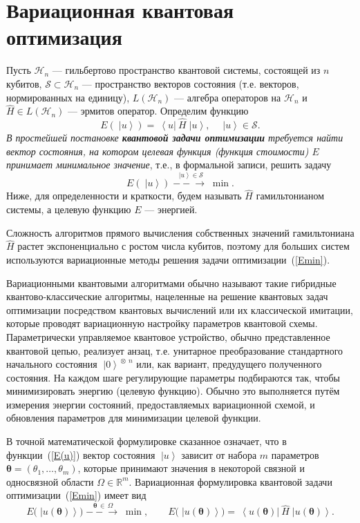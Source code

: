 \documentclass[a4paper]{report}
\newcommand{\ket}[1] {\!\!\;\ensuremath{\left|#1\right\rangle}}
\newcommand{\bra}[1] {\!\!\:\ensuremath{\left\langle#1\right|\!\!\:}}
\begin{document}
\section{Вариационная квантовая оптимизация}

Пусть $\mathcal{H}_n$ --- гильбертово пространство квантовой системы, состоящей из $n$ кубитов, ${\mathcal{S}\subset\mathcal{H}_n}$ --- пространство векторов состояния (т.е. векторов, нормированных на единицу), $L(\mathcal{H}_n)$ --- алгебра операторов на $\mathcal{H}_n$ и ${\hat{H}\in L(\mathcal{H}_n)}$ --- эрмитов оператор. Определим функцию
\begin{equation}\label{E(u)}
  E(\ket{u})=\bra{u}\hat{H}\ket{u},\quad \ket{u}\in\mathcal{S}.
\end{equation}
\textit{В простейшей постановке \textbf{квантовой задачи оптимизации} требуется найти вектор состояния, на котором целевая функция (функция стоимости) $E$ принимает минимальное значение}, т.е., в формальной записи, решить задачу
\begin{equation}\label{Emin}
  E(\ket{u})\; \stackrel{\ket{u}\in\mathcal{S}}{-\!-\!\!\!\longrightarrow}\; \min.
\end{equation}
Ниже, для определенности и краткости, будем называть $\hat{H}$ гамильтонианом системы, а целевую функцию $E$ --- энергией.

Сложность алгоритмов прямого вычисления собственных значений гамильтониана $\hat{H}$ растет экспоненциально с ростом числа кубитов, поэтому для больших систем используются вариационные методы решения задачи оптимизации~(\ref{Emin}).

Вариационными квантовыми алгоритмами обычно называют такие гибридные квантово-классические алгоритмы, нацеленные на решение квантовых задач оптимизации посредством квантовых вычислений или их классической имитации, которые проводят вариационную настройку параметров квантовой схемы. Параметрически управляемое квантовое устройство, обычно представленное квантовой цепью, реализует анзац, т.е. унитарное преобразование стандартного начального состояния ${\ket{0}^{\!\otimes\:\! n}}$ или, как вариант, предудущего полученного состояния. На каждом шаге регулирующие параметры подбираются так, чтобы минимизировать энергию (целевую функцию). Обычно это выполняется путём измерения энергии состояний, предоставляемых вариационной схемой, и обновления параметров для минимизации целевой функции.

В точной математической формулировке сказанное означает, что в функции~(\ref{E(u)}) вектор состояния $\ket{u}$ зависит от набора $m$ параметров $\bm\theta=(\theta_1, \ldots,\theta_m)$, которые принимают значения в некоторой связной и односвязной области $\Omega\in\mathbb{R}^m$. Вариационная формулировка квантовой задачи оптимизации~(\ref{Emin}) имеет вид
\begin{equation}\label{Emin-theta}
  E\big(\ket{u(\bm\theta)}\big)\; \stackrel{\bm\theta\,\in\,\Omega}{-\!-\!\!\!\longrightarrow}\; \min, \qquad E\big(\ket{u(\bm\theta)}\big)=\bra{u(\bm\theta)}\hat{H}\ket{u(\bm\theta)}.
\end{equation}
\end{document}
